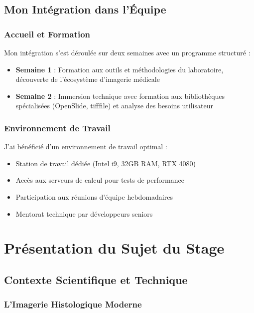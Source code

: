 \documentclass[12pt,a4paper]{report}
\begin{document}
\section{Mon Intégration dans l'Équipe}

\subsection{Accueil et Formation}

Mon intégration s'est déroulée sur deux semaines avec un programme structuré :

\begin{itemize}
\item \textbf{Semaine 1} : Formation aux outils et méthodologies du laboratoire, découverte de l'écosystème d'imagerie médicale
\item \textbf{Semaine 2} : Immersion technique avec formation aux bibliothèques spécialisées (OpenSlide, tifffile) et analyse des besoins utilisateur
\end{itemize}

\subsection{Environnement de Travail}

J'ai bénéficié d'un environnement de travail optimal :
\begin{itemize}
\item Station de travail dédiée (Intel i9, 32GB RAM, RTX 4080)
\item Accès aux serveurs de calcul pour tests de performance
\item Participation aux réunions d'équipe hebdomadaires
\item Mentorat technique par développeurs seniors
\end{itemize}

\chapter{Présentation du Sujet du Stage}

\section{Contexte Scientifique et Technique}

\subsection{L'Imagerie Histologique Moderne}
\end{document}
